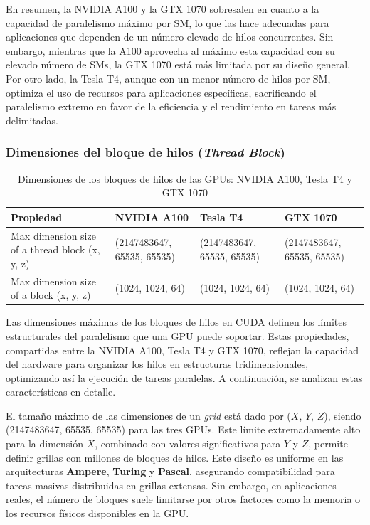 \documentclass{article}
\begin{document}
			En resumen, la NVIDIA A100 y la GTX 1070 sobresalen en cuanto a la capacidad de paralelismo máximo por SM, lo que las hace adecuadas para aplicaciones que dependen de un número elevado de hilos concurrentes. Sin embargo, mientras que la A100 aprovecha al máximo esta capacidad con su elevado número de SMs, la GTX 1070 está más limitada por su diseño general. Por otro lado, la Tesla T4, aunque con un menor número de hilos por SM, optimiza el uso de recursos para aplicaciones específicas, sacrificando el paralelismo extremo en favor de la eficiencia y el rendimiento en tareas más delimitadas.

		\subsubsection{Dimensiones del bloque de hilos (\textit{Thread Block})}

			\begin{table}[H]
				\begin{adjustbox}{width=\textwidth, keepaspectratio}
					\begin{tabular}{|l|l|l|l|}
						\hline
						\textbf{Propiedad} & \textbf{NVIDIA A100} & \textbf{Tesla T4} & \textbf{GTX 1070} \\ \hline
						Max dimension size of a thread block (x, y, z) & (2147483647, 65535, 65535) & (2147483647, 65535, 65535) & (2147483647, 65535, 65535) \\ \hline
						Max dimension size of a block (x, y, z) & (1024, 1024, 64) & (1024, 1024, 64) & (1024, 1024, 64) \\ \hline
					\end{tabular}
				\end{adjustbox}
				\centering
				\caption{Dimensiones de los bloques de hilos de las GPUs: NVIDIA A100, Tesla T4 y GTX 1070}
			\end{table}

			Las dimensiones máximas de los bloques de hilos en CUDA definen los límites estructurales del paralelismo que una GPU puede soportar. Estas propiedades, compartidas entre la NVIDIA A100, Tesla T4 y GTX 1070, reflejan la capacidad del hardware para organizar los hilos en estructuras tridimensionales, optimizando así la ejecución de tareas paralelas. A continuación, se analizan estas características en detalle.

			El tamaño máximo de las dimensiones de un \textit{grid} está dado por ($X$, $Y$, $Z$), siendo (2147483647, 65535, 65535) para las tres GPUs. Este límite extremadamente alto para la dimensión $X$, combinado con valores significativos para $Y$ y $Z$, permite definir grillas con millones de bloques de hilos. Este diseño es uniforme en las arquitecturas \textbf{Ampere}, \textbf{Turing} y \textbf{Pascal}, asegurando compatibilidad para tareas masivas distribuidas en grillas extensas. Sin embargo, en aplicaciones reales, el número de bloques suele limitarse por otros factores como la memoria o los recursos físicos disponibles en la GPU.
\end{document}
